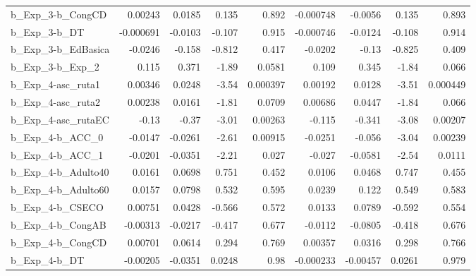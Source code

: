 \begin{tabular}{lrrrrrrrr}
b\_Exp\_3-b\_CongCD           &     0.00243 &       0.0185 &    0.135 &    0.892 &  -0.000748 &     -0.0056 &        0.135 &         0.893 \\
b\_Exp\_3-b\_DT               &   -0.000691 &      -0.0103 &   -0.107 &    0.915 &  -0.000746 &     -0.0124 &       -0.108 &         0.914 \\
b\_Exp\_3-b\_EdBasica         &     -0.0246 &       -0.158 &   -0.812 &    0.417 &    -0.0202 &       -0.13 &       -0.825 &         0.409 \\
b\_Exp\_3-b\_Exp\_2            &       0.115 &        0.371 &    -1.89 &   0.0581 &      0.109 &       0.345 &        -1.84 &         0.066 \\
b\_Exp\_4-asc\_ruta1          &     0.00346 &       0.0248 &    -3.54 & 0.000397 &    0.00192 &      0.0128 &        -3.51 &      0.000449 \\
b\_Exp\_4-asc\_ruta2          &     0.00238 &       0.0161 &    -1.81 &   0.0709 &    0.00686 &      0.0447 &        -1.84 &         0.066 \\
b\_Exp\_4-asc\_rutaEC         &       -0.13 &        -0.37 &    -3.01 &  0.00263 &     -0.115 &      -0.341 &        -3.08 &       0.00207 \\
b\_Exp\_4-b\_ACC\_0            &     -0.0147 &      -0.0261 &    -2.61 &  0.00915 &    -0.0251 &      -0.056 &        -3.04 &       0.00239 \\
b\_Exp\_4-b\_ACC\_1            &     -0.0201 &      -0.0351 &    -2.21 &    0.027 &     -0.027 &     -0.0581 &        -2.54 &        0.0111 \\
b\_Exp\_4-b\_Adulto40         &      0.0161 &       0.0698 &    0.751 &    0.452 &     0.0106 &      0.0468 &        0.747 &         0.455 \\
b\_Exp\_4-b\_Adulto60         &      0.0157 &       0.0798 &    0.532 &    0.595 &     0.0239 &       0.122 &        0.549 &         0.583 \\
b\_Exp\_4-b\_CSECO            &     0.00751 &       0.0428 &   -0.566 &    0.572 &     0.0133 &      0.0789 &       -0.592 &         0.554 \\
b\_Exp\_4-b\_CongAB           &    -0.00313 &      -0.0217 &   -0.417 &    0.677 &    -0.0112 &     -0.0805 &       -0.418 &         0.676 \\
b\_Exp\_4-b\_CongCD           &     0.00701 &       0.0614 &    0.294 &    0.769 &    0.00357 &      0.0316 &        0.298 &         0.766 \\
b\_Exp\_4-b\_DT               &    -0.00205 &      -0.0351 &   0.0248 &     0.98 &  -0.000233 &    -0.00457 &       0.0261 &         0.979 \\

\end{tabular}
